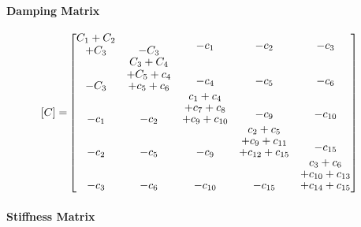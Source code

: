 \documentclass[12pt,a4paper]{article}
\begin{document}
\paragraph{Damping Matrix}

\begin{equation}\label{Eq.damping_matrix_dimensional_combined}
\begin{aligned}
[C] =& 
\begin{bmatrix}
\shortstack{$C_1 + C_2$ \\ $+ C_3$} & -C_3 & \shortstack{$-c_1$ \\ \,} & \shortstack{$-c_2$ \\ \,} & \shortstack{$-c_3$ \\ \,} \\
-C_3 & \shortstack{$C_3 + C_4$ \\ $+ C_5 + c_4$ \\ $+ c_5 + c_6$} & \shortstack{$-c_4$ \\ \,} & \shortstack{$-c_5$ \\ \,} & \shortstack{$-c_6$ \\ \,} \\
-c_1 & -c_2 & \shortstack{$c_1 + c_4$ \\ $+ c_7 + c_8$ \\ $+ c_9 + c_{10}$} & \shortstack{$-c_9$ \\ \,} & \shortstack{$-c_{10}$ \\ \,} \\
-c_2 & -c_5 & -c_9 & \shortstack{$c_2 + c_5$ \\ $+ c_9 + c_{11}$ \\ $+ c_{12} + c_{15}$} & \shortstack{$-c_{15}$ \\ \,} \\
-c_3 & -c_{6} & -c_{10} & -c_{15} & \shortstack{$c_3 + c_6$ \\ $+ c_{10} + c_{13}$ \\ $+ c_{14} + c_{15}$}
\end{bmatrix}
\end{aligned}
\end{equation}

\paragraph{Stiffness Matrix}
\end{document}
